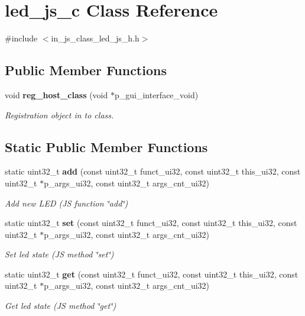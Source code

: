 \section{led\+\_\+js\+\_\+c Class Reference}
\label{classled__js__c}


{\ttfamily \#include $<$in\+\_\+js\+\_\+class\+\_\+led\+\_\+js\+\_\+h.\+h$>$}

\subsection*{Public Member Functions}
\begin{DoxyCompactItemize}
\item 
void \textbf{ reg\+\_\+host\+\_\+class} (void $\ast$p\+\_\+gui\+\_\+interface\+\_\+void)
\begin{DoxyCompactList}\small\item\em Registration object in to class. \end{DoxyCompactList}\end{DoxyCompactItemize}
\subsection*{Static Public Member Functions}
\begin{DoxyCompactItemize}
\item 
static uint32\+\_\+t \textbf{ add} (const uint32\+\_\+t funct\+\_\+ui32, const uint32\+\_\+t this\+\_\+ui32, const uint32\+\_\+t $\ast$p\+\_\+args\+\_\+ui32, const uint32\+\_\+t args\+\_\+cnt\+\_\+ui32)
\begin{DoxyCompactList}\small\item\em Add new L\+ED (JS function \char`\"{}add\char`\"{}) \end{DoxyCompactList}\item 
static uint32\+\_\+t \textbf{ set} (const uint32\+\_\+t funct\+\_\+ui32, const uint32\+\_\+t this\+\_\+ui32, const uint32\+\_\+t $\ast$p\+\_\+args\+\_\+ui32, const uint32\+\_\+t args\+\_\+cnt\+\_\+ui32)
\begin{DoxyCompactList}\small\item\em Set led state (JS method \char`\"{}set\char`\"{}) \end{DoxyCompactList}\item 
static uint32\+\_\+t \textbf{ get} (const uint32\+\_\+t funct\+\_\+ui32, const uint32\+\_\+t this\+\_\+ui32, const uint32\+\_\+t $\ast$p\+\_\+args\+\_\+ui32, const uint32\+\_\+t args\+\_\+cnt\+\_\+ui32)
\begin{DoxyCompactList}\small\item\em Get led state (JS method \char`\"{}get\char`\"{}) \end{DoxyCompactList}\end{DoxyCompactItemize}


